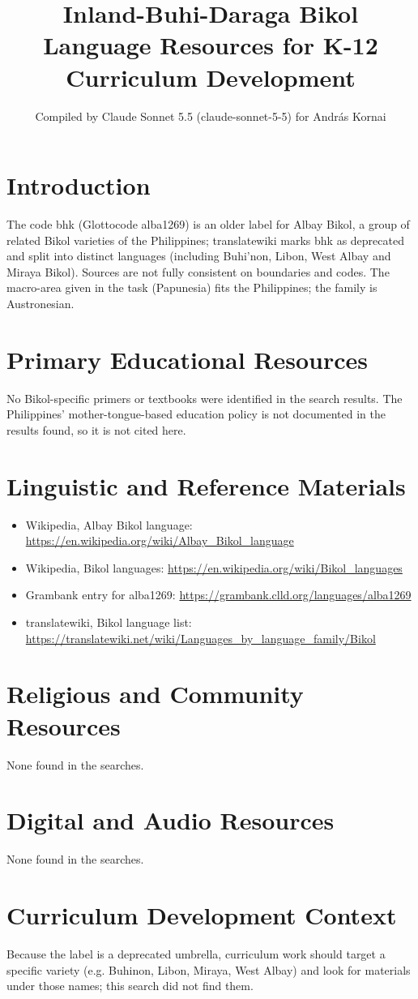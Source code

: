 \documentclass[12pt]{article}
\title{Inland-Buhi-Daraga Bikol Language Resources for K-12 Curriculum Development}
\author{Compiled by Claude Sonnet 5.5 (claude-sonnet-5-5) for Andr\'as Kornai}
\date{}
\begin{document}
\maketitle

\section{Introduction}
The code bhk (Glottocode alba1269) is an older label for Albay Bikol, a group of related Bikol varieties of the Philippines; translatewiki marks bhk as deprecated and split into distinct languages (including Buhi'non, Libon, West Albay and Miraya Bikol). Sources are not fully consistent on boundaries and codes. The macro-area given in the task (Papunesia) fits the Philippines; the family is Austronesian.

\section{Primary Educational Resources}
No Bikol-specific primers or textbooks were identified in the search results. The Philippines' mother-tongue-based education policy is not documented in the results found, so it is not cited here.

\section{Linguistic and Reference Materials}
\begin{itemize}
\item Wikipedia, Albay Bikol language: \url{https://en.wikipedia.org/wiki/Albay_Bikol_language}
\item Wikipedia, Bikol languages: \url{https://en.wikipedia.org/wiki/Bikol_languages}
\item Grambank entry for alba1269: \url{https://grambank.clld.org/languages/alba1269}
\item translatewiki, Bikol language list: \url{https://translatewiki.net/wiki/Languages_by_language_family/Bikol}
\end{itemize}

\section{Religious and Community Resources}
None found in the searches.

\section{Digital and Audio Resources}
None found in the searches.

\section{Curriculum Development Context}
Because the label is a deprecated umbrella, curriculum work should target a specific variety (e.g. Buhinon, Libon, Miraya, West Albay) and look for materials under those names; this search did not find them.
\end{document}
